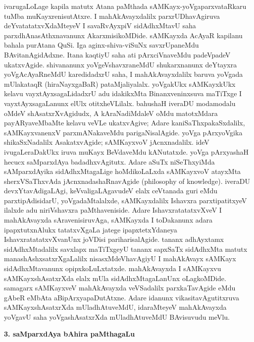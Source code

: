 ivarugaLoLage kapila matutx Atana paMthada sAMKayx-yoVgaparxvataRkaru tuMba muKayxrenisutAtxre. I mahAkAvayxdalilx parxrUDhavAgiruva deYvatatatxvXdaMteyeV I savaRvAyxpiV sidAdhxMtavU saha parxdhAnasAthxnavanunx AkarxmisikoMDide. sAMKayxda AcAyaR kapilanu bahala purAtana QuSi. Iga aginx-shiva-viSuNx savxrUpaneMdu BAvitanAgidAdxne. Itana kaqtiyU saha ati pArxciVnaveMdu padeVpadeV ukatxvAgide. shivananunx yoVgeVshavxraneMdU shukarxnanunx deYtayxra yoVgAcAyaRneMdU karedidadxrU saha, I mahAkAvayxdalilx baruva yoVgada mUlakataqR (hiraNayxgaBaR) pataMjaliyalalx. yoVgakUkx sAMKayxkUkx kelavu vayxtAyxsagaLidadxrU adu idakikxMta Binanxveninxsuva maTiTxge I vayxtAyxsagaLanunx elUlx otitxheVLilalx. bahushaH iveraDU modamodalu oMdeV shAsatxrXvAgidudx, A kAraNadiMdaleV oMdu matotxMdara payARyaveMbaMte kelavu veVLe ukatxvAgive; Adare kaniSaThxpakaSxdalilx, sAMKayxvanenxV parxmANakaveMdu parigaNisalAgide. yoVga pArxyoVgika shikaSxNadalilx AsakatxvAgide; sAMKayxvoV jAcnxnadalilx. ideV ivugaLeraDakUkx iruva muKayx BeVdaveMdu kANutatxde. yoVga pArxyashaH hecucx saMparxdAya badadhxvAgitutx. Adare aSuTx niSeThxyiMda sAMparxdAyika sidAdhxMtagaLige hoMdikoLaLxda sAMKayxvoV atayxMta sherxVSaThxvAda jAcnxnadashaRnavAgide {\rm(philosophy of knowledge).} iveraDU devxYtavAdigaLAgi, keVvaligaLAgavudeV elalx ceVtanada guri eMdu parxtipAdisidarU, yoVgadaMtalalxde, sAMKayxdalilx Ishavxra parxtipatitxyeV ilalxde adu niriVshavxra paMthaveniside. Adare IshavxratatatxvXveV I mahAkAvayxda sAravenisiruvAga, sAMKayxda I toDakanunx adara ipapxtutxnAlukx tatatxvXgaLa jatege ipapxtetxYdaneya IshavxratatatxvXvanUnx joVDisi pariharisalAgide. tananx adhAyxtamx sidAdhxMtadalilx savxlapx maTiTxgeyU tananx sapxSaTx sidAdhxMta matutx manashAshxsatxrXgaLalilx nisasxMdeVhavAgiyU I mahAkAvayx sAMKayx sidAdhxMtavanunx opipxkoLuLxtatxde. mahAkAvayxda I sAMKayxvu sAMKayxshAsatxrXda elalx mUla sidAdhxMtagaLanUnx oLagkoMDide. samagarx sAMKayxveV mahAkAvayxda veVSadalilx parxkaTavAgide eMdu gAbeR eMbAta aBipArxyapaDutAtxne. Adare idanunx vikasitavAgutitxruva sAMKayxshAsatxrXda mUladhAtuveMdU, idaraMteyeV mahAkAvayxda yoVgavU saha yoVgashAsatxrXda mUladhAtuveMdU BAvisuvudu meVlu.

\bigskip
\begin{center}
{\Large\bf 3. saMparxdAya bAhira paMthagaLu}
\end{center}

